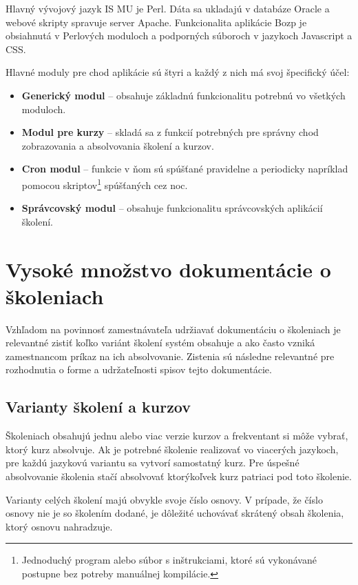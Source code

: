 \documentclass[
  digital,     %
  oneside,     %
  nosansbold,  %
  nocolorbold, %
  lof,         %
  nolot,         %
]{fithesis4}
\begin{document}
\noindent
Hlavný vývojový jazyk IS MU je Perl. Dáta sa ukladajú v databáze Oracle a webové skripty spravuje server Apache. Funkcionalita aplikácie Bozp je obsiahnutá v Perlových moduloch a podporných súboroch v jazykoch Javascript a CSS.

Hlavné moduly pre chod aplikácie sú štyri a každý z nich má svoj špecifický účel:

\begin{itemize}
    \item \textbf{Generický modul} – obsahuje základnú funkcionalitu potrebnú vo všetkých moduloch.
    \item \textbf{Modul pre kurzy} – skladá sa z funkcií potrebných pre správny chod zobrazovania a absolvovania školení a kurzov.
    \item \textbf{Cron modul} – funkcie v ňom sú spúšťané pravidelne a periodicky napríklad pomocou skriptov\footnote{Jednoduchý program alebo súbor s inštrukciami, ktoré sú vykonávané postupne bez potreby manuálnej kompilácie.} spúšťaných cez noc.
    \item \textbf{Správcovský modul} – obsahuje funkcionalitu správcovských aplikácií školení.
\end{itemize}

\section{Vysoké množstvo dokumentácie o školeniach}
Vzhľadom na povinnosť zamestnávateľa udržiavať dokumentáciu o školeniach je relevantné zistiť koľko variánt školení systém obsahuje a ako často vzniká zamestnancom príkaz na ich absolvovanie. Zistenia sú následne relevantné pre rozhodnutia o forme a udržateľnosti spisov tejto dokumentácie.

\subsection*{Varianty školení a kurzov}
Školeniach obsahujú jednu alebo viac verzie kurzov a frekventant si môže vybrať, ktorý kurz absolvuje. Ak je potrebné školenie realizovať vo viacerých jazykoch, pre každú jazykovú variantu sa vytvorí samostatný kurz. Pre úspešné absolvovanie školenia stačí absolvovať ktorýkoľvek kurz patriaci pod toto školenie.

Varianty celých školení majú obvykle svoje číslo osnovy. V prípade, že číslo osnovy nie je so školením dodané, je dôležité uchovávať skrátený obsah školenia, ktorý osnovu nahradzuje.
\end{document}
